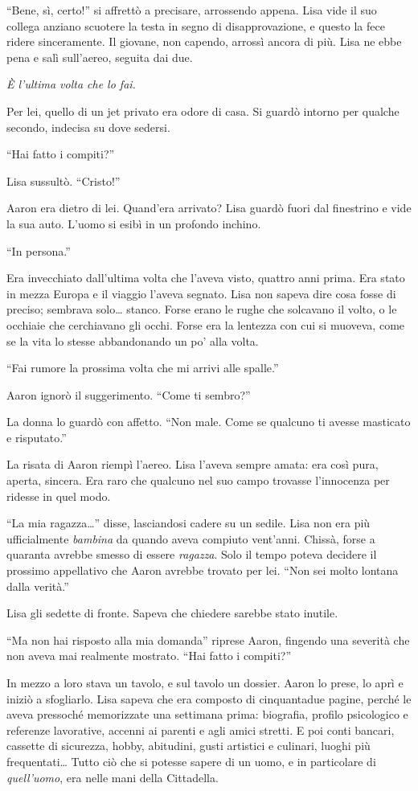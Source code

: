 \documentclass[a4paper,oneside,11pt]{memoir}
\begin{document}
``Bene, sì, certo!'' si affrettò a precisare, arrossendo appena. Lisa vide il
suo collega anziano scuotere la testa in segno di disapprovazione, e questo la
fece ridere sinceramente. Il giovane, non capendo, arrossì ancora di più. Lisa
ne ebbe pena e salì sull'aereo, seguita dai due.

\emph{È l'ultima volta che lo fai.}

Per lei, quello di un jet privato era odore di casa. Si guardò intorno per
qualche secondo, indecisa su dove sedersi.

``Hai fatto i compiti?''

Lisa sussultò. ``Cristo!''

Aaron era dietro di lei. Quand'era arrivato? Lisa guardò fuori dal finestrino e
vide la sua auto. L'uomo si esibì in un profondo inchino.

``In persona.''

Era invecchiato dall'ultima volta che l'aveva visto, quattro anni prima. Era
stato in mezza Europa e il viaggio l'aveva segnato. Lisa non sapeva dire cosa
fosse di preciso; sembrava solo\dots{} stanco. Forse erano le rughe che solcavano
il volto, o le occhiaie che cerchiavano gli occhi. Forse era la lentezza con cui
si muoveva, come se la vita lo stesse abbandonando un po' alla volta.

``Fai rumore la prossima volta che mi arrivi alle spalle.''

Aaron ignorò il suggerimento. ``Come ti sembro?''

La donna lo guardò con affetto. ``Non male. Come se qualcuno ti avesse masticato
e risputato.''

La risata di Aaron riempì l'aereo. Lisa l'aveva sempre amata: era così pura,
aperta, sincera. Era raro che qualcuno nel suo campo trovasse l'innocenza per
ridesse in quel modo.

``La mia ragazza\dots{}'' disse, lasciandosi cadere su un sedile. Lisa non era più
ufficialmente \emph{bambina} da quando aveva compiuto vent'anni. Chissà, forse a
quaranta avrebbe smesso di essere \emph{ragazza}. Solo il tempo poteva decidere
il prossimo appellativo che Aaron avrebbe trovato per lei. ``Non sei molto
lontana dalla verità.''

Lisa gli sedette di fronte. Sapeva che chiedere sarebbe stato inutile.

``Ma non hai risposto alla mia domanda'' riprese Aaron, fingendo una severità
che non aveva mai realmente mostrato. ``Hai fatto i compiti?''

In mezzo a loro stava un tavolo, e sul tavolo un dossier. Aaron lo prese, lo
aprì e iniziò a sfogliarlo. Lisa sapeva che era composto di cinquantadue pagine,
perché le aveva pressoché memorizzate una settimana prima: biografia, profilo
psicologico e referenze lavorative, accenni ai parenti e agli amici stretti. E
poi conti bancari, cassette di sicurezza, hobby, abitudini, gusti artistici e
culinari, luoghi più frequentati\dots{} Tutto ciò che si potesse sapere di un
uomo, e in particolare di \emph{quell'uomo}, era nelle mani della Cittadella.
\end{document}
